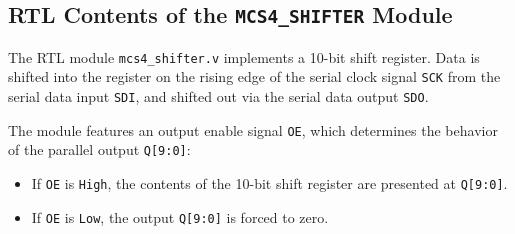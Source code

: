\subsection{\textbf{RTL Contents of the \texttt{MCS4\_SHIFTER} Module}}
The RTL module \texttt{mcs4\_shifter.v} implements a 10-bit shift register.  
Data is shifted into the register on the rising edge of the serial clock signal \texttt{SCK} from the serial data input \texttt{SDI}, and shifted out via the serial data output \texttt{SDO}.

The module features an output enable signal \texttt{OE}, which determines the behavior of the parallel output \texttt{Q[9:0]}:
\begin{itemize}
  \item If \texttt{OE} is \texttt{High}, the contents of the 10-bit shift register are presented at \texttt{Q[9:0]}.
  \item If \texttt{OE} is \texttt{Low}, the output \texttt{Q[9:0]} is forced to zero.
\end{itemize}

